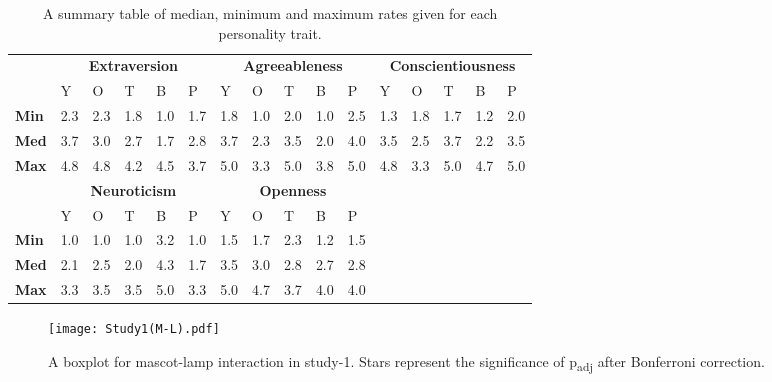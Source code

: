 \begin{table}[!htb]
    \renewcommand{\arraystretch}{1}
    \begin{center}
        \begin{tabular}{p{}|
        p{}|p{}|p{}|p{}|p{}||
        p{}|p{}|p{}|p{}|p{}||
        p{}|p{}|p{}|p{}|p{}|}
            \cline{2-16}
            & \multicolumn{5}{c||}{\textbf{Extraversion}} & \multicolumn{5}{c||}{\textbf{Agreeableness}}
            & \multicolumn{5}{c|}{\textbf{Conscientiousness}} \\
            \cline{2-16}
            & Y & O & T & B & P & Y & O & T & B & P & Y & O & T & B & P     \\
            \cline{2-16}
            \textbf{Min}    & 2.3 & 2.3 & 1.8 & 1.0 & 1.7 & 1.8 & 1.0 & 2.0 & 1.0 & 2.5 & 1.3 & 1.8 & 1.7 & 1.2 & 2.0  \\
            \textbf{Med}    & 3.7 & 3.0 & 2.7 & 1.7 & 2.8 & 3.7 & 2.3 & 3.5 & 2.0 & 4.0 & 3.5 & 2.5 & 3.7 & 2.2 & 3.5  \\
            \textbf{Max}    & 4.8 & 4.8 & 4.2 & 4.5 & 3.7 & 5.0 & 3.3 & 5.0 & 3.8 & 5.0 & 4.8 & 3.3 & 5.0 & 4.7 & 5.0 \\
            \cline{2-16}
            \cline{2-11}
            &  \multicolumn{5}{|c||}{\textbf{Neuroticism}} & \multicolumn{5}{|c||}{\textbf{Openness}} \\
            \cline{2-11}
            & Y & O & T & B & P & Y & O & T & B & P            \\
            \cline{2-11}
            \textbf{Min}    & 1.0 & 1.0 & 1.0 & 3.2 & 1.0 & 1.5 & 1.7 & 2.3 & 1.2 & 1.5    \\
            \textbf{Med}    & 2.1 & 2.5 & 2.0 & 4.3 & 1.7 & 3.5 & 3.0 & 2.8 & 2.7 & 2.8    \\
            \textbf{Max}    & 3.3 & 3.5 & 3.5 & 5.0 & 3.3 & 5.0 & 4.7 & 3.7 & 4.0 & 4.0    \\
            \cline{2-11}
        \end{tabular}
        \caption[]{A summary table of median, minimum and maximum rates given for each personality trait.\footnotemark}
        \label{table:medianML1}
    \end{center}
\end{table}

\begin{figure}[!htb]
    \centering
    \texttt{[image: Study1(M-L).pdf]}
    \caption[]{A boxplot for mascot-lamp interaction in study-1.
    Stars represent the significance of p\textsubscript{adj} after Bonferroni correction.\footnotemark}
    \label{fig:ML1}
\end{figure}
